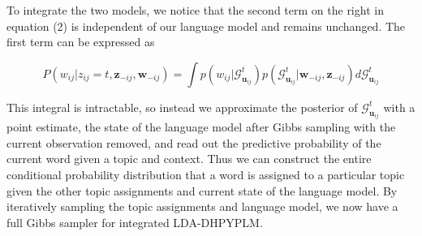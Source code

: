 To integrate the two models, we notice that the second term on the right in equation (2) is independent of our language model and remains unchanged.  The first term can be expressed as

\begin{equation}
P(w_{ij}|z_{ij}=t, \mathbf{z}_{-ij}, \mathbf{w}_{-ij}) = \int p(w_{ij}|\mathcal{G}^t_{\mathbf{u}_{ij}}) p(\mathcal{G}^t_{\mathbf{u}_{ij}}| \mathbf{w}_{-ij}, \mathbf{z}_{-ij}) d\mathcal{G}^t_{\mathbf{u}_{ij}}
\end{equation}

This integral is intractable, so instead we approximate the posterior of $\mathcal{G}^t_{\mathbf{u}_{ij}}$ with a point estimate, the state of the language model after Gibbs sampling with the current observation removed, and read out the predictive probability of the current word given a topic and context.  Thus we can construct the entire conditional probability distribution that a word is assigned to a particular topic given the other topic assignments and current state of the language model.  By iteratively sampling the topic assignments and language model, we now have a full Gibbs sampler for integrated LDA-DHPYPLM.
